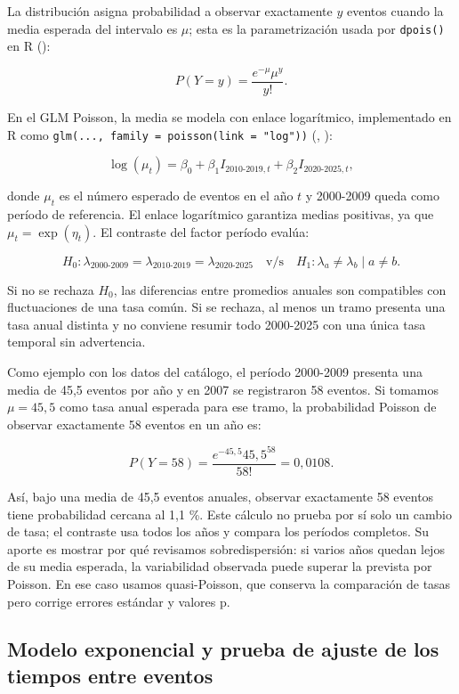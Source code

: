 \documentclass[
  spanish,
  letterpaper,
  DIV=11,
  numbers=noendperiod]{scrartcl}
\begin{document}
La distribución asigna probabilidad a observar exactamente \(y\) eventos
cuando la media esperada del intervalo es \(\mu\); esta es la
parametrización usada por \texttt{dpois()} en R
():

\[
P(Y=y)=\frac{e^{-\mu}\mu^y}{y!}.
\]

En el GLM Poisson, la media se modela con enlace logarítmico,
implementado en R como
\texttt{glm(...,\ family\ =\ poisson(link\ =\ "log"))}
(,
):

\[
\log(\mu_t)=\beta_0+\beta_1 I_{\text{2010-2019},t}+\beta_2 I_{\text{2020-2025},t},
\]

donde \(\mu_t\) es el número esperado de eventos en el año \(t\) y
2000-2009 queda como período de referencia. El enlace logarítmico
garantiza medias positivas, ya que \(\mu_t=\exp(\eta_t)\). El contraste
del factor período evalúa:

\[
H_0:\lambda_{\text{2000-2009}}=\lambda_{\text{2010-2019}}=\lambda_{\text{2020-2025}}
\quad \text{v/s} \quad
H_1:\lambda_a\neq\lambda_b \mid a\neq b.
\]

Si no se rechaza \(H_0\), las diferencias entre promedios anuales son
compatibles con fluctuaciones de una tasa común. Si se rechaza, al menos
un tramo presenta una tasa anual distinta y no conviene resumir todo
2000-2025 con una única tasa temporal sin advertencia.

Como ejemplo con los datos del catálogo, el período 2000-2009 presenta
una media de 45,5 eventos por año y en 2007 se registraron 58 eventos.
Si tomamos \(\mu=45{,}5\) como tasa anual esperada para ese tramo, la
probabilidad Poisson de observar exactamente 58 eventos en un año es:

\[
P(Y=58)=\frac{e^{-45{,}5}45{,}5^{58}}{58!}
=0{,}0108.
\]

Así, bajo una media de 45,5 eventos anuales, observar exactamente 58
eventos tiene probabilidad cercana al 1,1 \%. Este cálculo no prueba por
sí solo un cambio de tasa; el contraste usa todos los años y compara los
períodos completos. Su aporte es mostrar por qué revisamos
sobredispersión: si varios años quedan lejos de su media esperada, la
variabilidad observada puede superar la prevista por Poisson. En ese
caso usamos quasi-Poisson, que conserva la comparación de tasas pero
corrige errores estándar y valores p.

\subsection{Modelo exponencial y prueba de ajuste de los tiempos entre
eventos}\label{sec-anexo-exponencial-ks}
\end{document}

